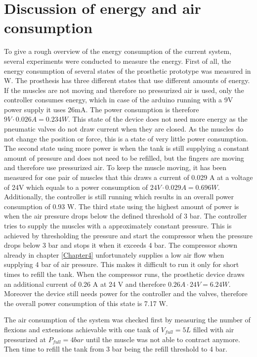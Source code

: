 \documentclass[main]{subfiles}
\begin{document}
\section{Discussion of energy and air consumption}

To give a rough overview of the energy consumption of the current system, several experiments were conducted to measure the energy. First of all, the energy consumption of several states of the prosthetic prototype was measured in W. The prosthesis has three different states that use different amounts of energy. If the muscles are not moving and therefore no pressurized air is used, only the controller consumes energy, which in case of the arduino running with a 9V power supply it uses 26mA. The power consumption is therefore $9 V \cdot 0.026A = 0.234 W$. This state of the device does not need more energy as the pneumatic valves do not draw current when they are closed. As the muscles do not change the position or force, this is a state of very little power consumption.
The second state using more power is when the tank is still supplying a constant amount of pressure and does not need to be refilled, but the fingers are moving and therefore use pressurized air. To keep the muscle moving, it has been measured for one pair of muscles that this draws a current of 0.029 A at a voltage of 24V which equals to a power consumption of $24V \cdot 0.029A = 0.696 W$. Additionally, the controller is still running which results in an overall power consumption of 0.93 W.
The third state using the highest amount of power is when the air pressure drops below the defined threshold of 3 bar. The controller tries to supply the muscles with a approximately constant pressure. This is achieved by thresholding the pressure and start the compressor when the pressure drops below 3 bar and stops it when it exceeds 4 bar. The compressor shown already in chapter \ref{Chapter4} unfortunately supplies a low air flow when supplying 4 bar of air pressure. This makes it difficult to run it only for short times to refill the tank. When the compressor runs, the prosthetic device draws an additional current of 0.26 A at 24 V and therefore $0.26A \cdot 24V = 6.24 W$. Moreover the device still needs power for the controller and the valves, therefore the overall power consumption of this state is 7.17 W.

The air consumption of the system was checked first by measuring the number of flexions and extensions achievable with one tank of $ V_{full} =  5L$ filled with air pressurized at $ P_{full} = 4 bar$ until the muscle was not able to contract anymore. Then time to refill the tank from 3 bar being the refill threshold to 4 bar.
\end{document}
